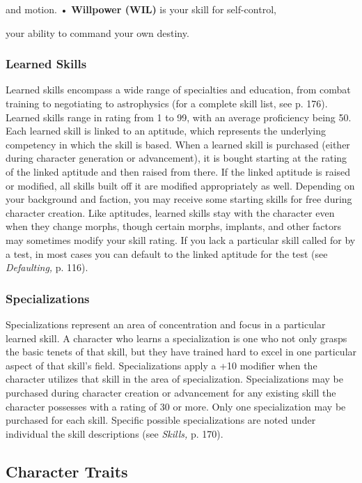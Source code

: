and motion.
•  \textbf{Willpower (WIL)} is your skill for self-control, 

your ability to command your own destiny.

\subsubsection{Learned Skills}

Learned skills encompass a wide range of specialties 
and education, from combat training to negotiating 
to astrophysics (for a complete skill list, see p. 176). 
Learned skills range in rating from 1 to 99, with an 
average proficiency being 50. Each learned skill is 
linked to an aptitude, which represents the underlying 
competency in which the skill is based. When a learned 
skill is purchased (either during character generation 
or advancement), it is bought starting at the rating of 
the linked aptitude and then raised from there. If the 
linked aptitude is raised or modified, all skills built off 
it are modified appropriately as well.
Depending on your background and faction, you 
may receive some starting skills for free during 
character creation. Like aptitudes, learned skills stay 
with the character even when they change morphs, 
though certain morphs, implants, and other factors 
may sometimes modify your skill rating. If you lack 
a particular skill called for by a test, in most cases 
you can default to the linked aptitude for the test (see 
\textit{Defaulting,} p. 116).

\subsubsection{Specializations}

Specializations represent an area of concentration and 
focus in a particular learned skill. A character who 
learns a specialization is one who not only grasps the 
basic tenets of that skill, but they have trained hard 
to excel in one particular aspect of that skill's field. 
Specializations apply a +10 modifier when the character
utilizes that skill in the area of specialization.
Specializations may be purchased during character 
creation or advancement for any existing skill the 
character possesses with a rating of 30 or more. Only 
one specialization may be purchased for each skill. 
Specific possible specializations are noted under individual
the skill descriptions (see \textit{Skills,} p. 170).

\subsection{Character Traits}

